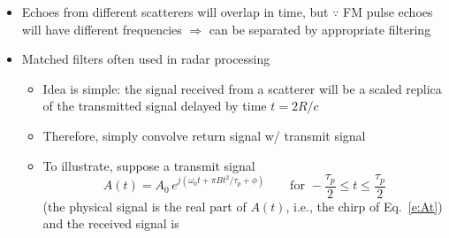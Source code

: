 \documentclass[11pt, oneside]{article}
\begin{document}
\begin{itemize}
	\item[--] Echoes from different scatterers will overlap in time, but $\because$ FM pulse echoes will have different frequencies $\Rightarrow$ can be separated by appropriate filtering
	\item[--] Matched filters often used in radar processing
	\begin{itemize}
		\item Idea is simple: the signal received from a scatterer will be a scaled replica of the transmitted signal delayed by time $t = 2R/c$
		\item Therefore, simply convolve return signal w/ transmit signal
		\item To illustrate, suppose a transmit signal
		\begin{equation}
			\label{e:Acplx}
			A(t) = A_0\,e^{j(\omega_0t + \pi Bt^2/\tau_p + \phi)} \qquad \text{for } -\frac{\tau_p}{2} \le t \le \frac{\tau_p}{2}
		\end{equation}
		(the physical signal is the real part of $A(t)$, i.e., the chirp of Eq.~\eqref{e:At})
		and the received signal is
		\begin{equation}

\end{equation}
\end{itemize}
\end{itemize}
\end{document}
